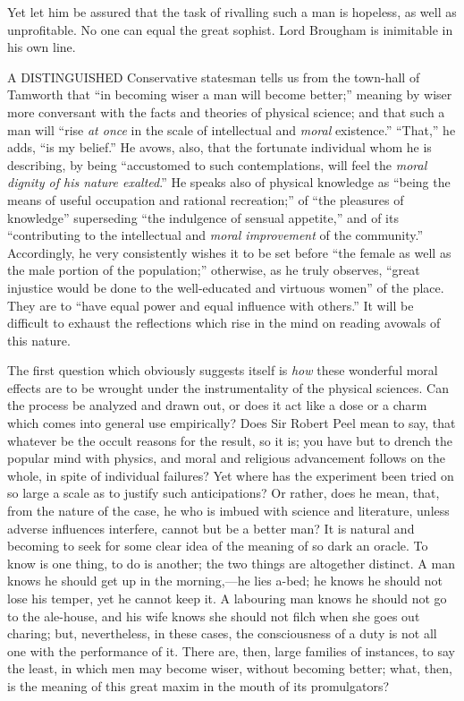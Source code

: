 Yet let him be assured that the task of rivalling such a man is
hopeless, as well as unprofitable. No one can equal the great sophist.
Lord Brougham is inimitable in his own line.


A DISTINGUISHED Conservative statesman tells us from the
town-hall of Tamworth that ``in becoming wiser a man will become
better;'' meaning by wiser more conversant with the facts and
theories of physical science; and that such a man will ``rise \emph{at
once} in the scale of intellectual and \emph{moral}
existence.'' ``That,'' he adds, ``is my belief.''
He avows, also, that the fortunate individual whom he is describing,
by being ``accustomed to such contemplations, will feel the \emph{moral
dignity of his nature exalted}.'' He speaks also of physical
knowledge as ``being the means of useful occupation and rational
recreation;'' of ``the pleasures of knowledge''
superseding ``the indulgence of sensual appetite,'' and of its
``contributing to the intellectual and \emph{moral improvement} of
the community.'' Accordingly, he very consistently wishes it to be
set before ``the female as well as the male portion of the
population;'' otherwise, as he truly observes, ``great
injustice would be done to the well-educated and virtuous women''
of the place. They are to ``have equal power and equal influence
with others.'' It will be difficult to exhaust the reflections
which rise in the mind on reading avowals of this nature.

The first question which obviously suggests itself is \emph{how}
these wonderful moral effects are to be wrought under the
instrumentality of the physical sciences. Can the process be
analyzed and drawn out, or does it act like a dose or a charm which
comes into general use empirically? Does Sir Robert Peel mean to say,
that whatever be the occult reasons for the result, so it is; you have
but to drench the popular mind with physics, and moral and religious
advancement follows on the whole, in spite of individual failures? Yet
where has the experiment been tried on so large a scale as to justify
such anticipations? Or rather, does he mean, that, from the nature of
the case, he who is imbued with science and literature, unless adverse
influences interfere, cannot but be a better man? It is natural and
becoming to seek for some clear idea of the meaning of so dark an
oracle. To know is one thing, to do is another; the two things are
altogether distinct. A man knows he should get up in the morning,—he
lies a-bed; he knows he should not lose his temper, yet he cannot keep
it. A labouring man knows he should not go to the ale-house, and his
wife knows she should not filch when she goes out charing; but,
nevertheless, in these cases, the consciousness of a duty is not all
one with the performance of it. There are, then, large families of
instances, to say the least, in which men may become wiser, without
becoming better; what, then, is the meaning of this great maxim in the
mouth of its promulgators?

